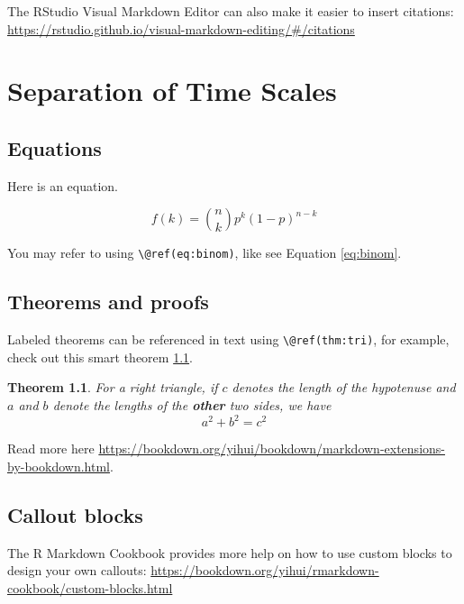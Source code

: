 \documentclass[
]{book}
\newtheorem{theorem}{Theorem}[chapter]
\theoremstyle{definition}
\theoremstyle{definition}
\theoremstyle{definition}
\theoremstyle{definition}
\theoremstyle{remark}
\begin{document}
The RStudio Visual Markdown Editor can also make it easier to insert citations: \url{https://rstudio.github.io/visual-markdown-editing/\#/citations}

\hypertarget{separation-of-time-scales}{%
\chapter{Separation of Time Scales}\label{separation-of-time-scales}}

\hypertarget{equations}{%
\section{Equations}\label{equations}}

Here is an equation.

\begin{equation} 
  f\left(k\right) = \binom{n}{k} p^k\left(1-p\right)^{n-k}
  \label{eq:binom}
\end{equation}

You may refer to using \texttt{\textbackslash{}@ref(eq:binom)}, like see Equation \eqref{eq:binom}.

\hypertarget{theorems-and-proofs}{%
\section{Theorems and proofs}\label{theorems-and-proofs}}

Labeled theorems can be referenced in text using \texttt{\textbackslash{}@ref(thm:tri)}, for example, check out this smart theorem \ref{thm:tri}.

\begin{theorem}
\protect\hypertarget{thm:tri}{}\label{thm:tri}For a right triangle, if \(c\) denotes the \emph{length} of the hypotenuse
and \(a\) and \(b\) denote the lengths of the \textbf{other} two sides, we have
\[a^2 + b^2 = c^2\]
\end{theorem}

Read more here \url{https://bookdown.org/yihui/bookdown/markdown-extensions-by-bookdown.html}.

\hypertarget{callout-blocks}{%
\section{Callout blocks}\label{callout-blocks}}

The R Markdown Cookbook provides more help on how to use custom blocks to design your own callouts: \url{https://bookdown.org/yihui/rmarkdown-cookbook/custom-blocks.html}
\end{document}
